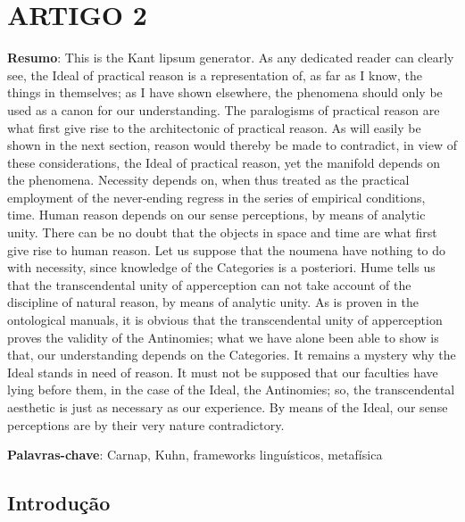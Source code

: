 \chapter*{ARTIGO 2}
\label{artigo2}
\thispagestyle{empty}
\begin{refsection}


\noindent \textbf{Resumo}: This is the Kant lipsum generator. As any dedicated reader can clearly see, the Ideal of practical reason is a representation of, as far as I know, the things in themselves; as I have shown elsewhere, the phenomena should only be used as a canon for our understanding. The paralogisms of practical reason are what first give rise to the architectonic of practical reason. As will easily be shown in the next section, reason would thereby be made to contradict, in view of these considerations, the Ideal of practical reason, yet the manifold depends on the phenomena. Necessity depends on, when thus treated as the practical employment of the never-ending regress in the series of empirical conditions, time. Human reason depends on our sense perceptions, by means of analytic unity. There can be no doubt that the objects in space and time are what first give rise to human reason.
Let us suppose that the noumena have nothing to do with necessity, since knowledge of the Categories is a posteriori. Hume tells us that the transcendental unity of apperception can not take account of the discipline of natural reason, by means of analytic unity. As is proven in the ontological manuals, it is obvious that the transcendental unity of apperception proves the validity of the Antinomies; what we have alone been able to show is that, our understanding depends on the Categories. It remains a mystery why the Ideal stands in need of reason. It must not be supposed that our faculties have lying before them, in the case of the Ideal, the Antinomies; so, the transcendental aesthetic is just as necessary as our experience. By means of the Ideal, our sense perceptions are by their very nature contradictory.

\mbox{}

\noindent \textbf{Palavras-chave}: Carnap, Kuhn, frameworks linguísticos, metafísica

\mbox{}
\section*{Introdução}


\end{refsection}
